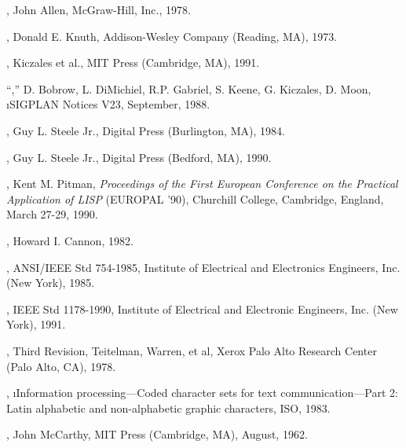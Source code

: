

\beginlist

\item{\bull} {\AnatomyOfLisp},
        John Allen, McGraw-Hill, Inc., 1978.

\item{\bull} {\KnuthVolThree},
             Donald E. Knuth, Addison-Wesley Company (Reading, MA), 1973.

\item{\bull} {\MetaObjectProtocol}, 	Kiczales et al., MIT Press (Cambridge, MA), 1991.

\item{\bull} ``\CLOSPaper,''
        D. Bobrow, L. DiMichiel, R.P. Gabriel, S. Keene, G. Kiczales, D. Moon,
        \i{SIGPLAN Notices} V23, September, 1988.

\item{\bull} {\CLtL},
        Guy L. Steele Jr., Digital Press (Burlington, MA), 1984.

\item{\bull} {\CLtLTwo},
        Guy L. Steele Jr., Digital Press (Bedford, MA), 1990.

\item{\bull} {\CondSysPaper}, 	Kent M. Pitman, 	{\it Proceedings of the First European Conference 	     on the Practical Application of LISP\/}
        (EUROPAL '90), 	Churchill College, Cambridge, England, 	March 27-29, 1990.

\item{\bull} {\FlavorsPaper}, 	Howard I. Cannon, 1982.

\item{\bull} {\IEEEFloatingPoint},
        ANSI/IEEE Std 754-1985,
        Institute of Electrical and Electronics Engineers, Inc. (New York), 1985.

\item{\bull} {\IEEEScheme}, 	IEEE Std 1178-1990, 	Institute of Electrical and Electronic Engineers, Inc. (New York), 1991.

\item{\bull} {\InterlispManual}, Third Revision, 	Teitelman, Warren, et al, 	Xerox Palo Alto Research Center (Palo Alto, CA), 1978.

\item{\bull} \ISOChars, 	\i{Information processing---Coded character sets 
           for text communication---Part 2: Latin alphabetic and non-alphabetic
           graphic characters},  	ISO, 1983.

\item{\bull} {\LispOnePointFive}, 	John McCarthy, MIT Press (Cambridge, MA), August, 1962.

